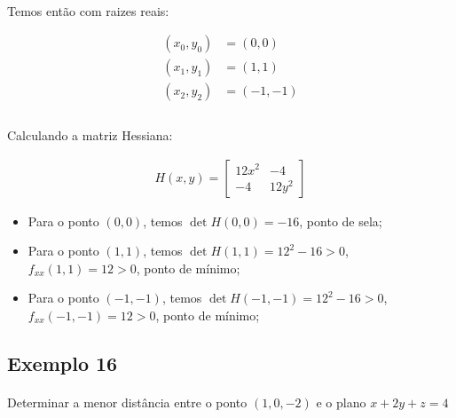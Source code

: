 \documentclass{article}
\begin{document}
            \paragraph{}
            Temos então com raizes reais:

            \begin{align*}
                (x_0, y_0) &= (0, 0)\\
                (x_1, y_1) &= (1, 1)\\
                (x_2, y_2) &= (-1, -1)\\
            \end{align*}

            \paragraph{}
            Calculando a matriz Hessiana:

            \begin{align*}
                H(x, y) =
                \left[
                    \begin{matrix}
                        12x^2 & -4\\
                        -4 & 12y^2
                    \end{matrix}
                \right]
            \end{align*}

            \begin{itemize}
                \item Para o ponto $(0,0)$, temos $\det H(0, 0) = -16$, ponto de sela;
                \item Para o ponto $(1,1)$, temos $\det H(1, 1) = 12^2 - 16 > 0$, $f_{xx}(1, 1) = 12 > 0$, ponto de mínimo;
                \item Para o ponto $(-1,-1)$, temos $\det H(-1, -1) = 12^2 - 16 > 0$, $f_{xx}(-1, -1) = 12 > 0$, ponto de mínimo;
            \end{itemize}
        
        \subsection{Exemplo 16}
            \paragraph{}
            Determinar a menor distância entre o ponto $(1, 0, -2)$ e o plano $x + 2y + z = 4$
\end{document}
